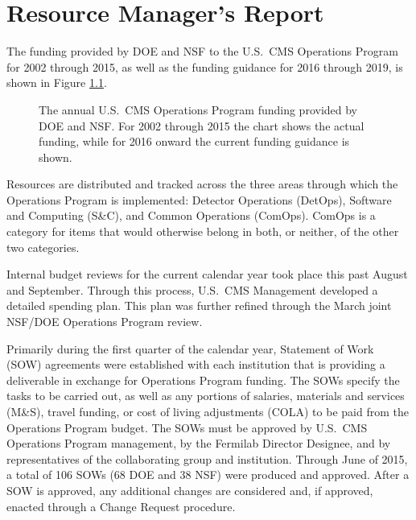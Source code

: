 
\chapter{Resource Manager's Report}

The funding provided by DOE and NSF to the U.S.\ CMS Operations Program
for 2002 through 2015, as well as the funding guidance for 2016 through 2019,
is shown in Figure \ref{fig:funding_profile}.

\begin{figure}[hbtp]
  \begin{center}
    \caption{The annual U.S.\ CMS Operations Program funding provided by
DOE and NSF.  For 2002 through 2015 the chart shows the actual funding,
while for 2016 onward the current funding guidance is shown.}
    \label{fig:funding_profile}
  \end{center}
\end{figure}

Resources are distributed and tracked across the three areas through
which the Operations Program is implemented:  Detector Operations (DetOps),
Software and Computing (S\&C), and Common Operations (ComOps).
ComOps is a category for items that would otherwise belong in both, or
neither, of the other two categories.

Internal budget reviews for the current calendar year took place this
past August and September.  Through this process, U.S.\ CMS Management
developed a detailed spending plan.  This plan was further refined
through the March joint NSF/DOE Operations Program review.

Primarily during the first quarter of the calendar year,
Statement of Work (SOW) agreements were established with each institution
that is providing a deliverable in exchange for Operations Program funding.
The SOWs specify the tasks to be carried out, as well as any portions of
salaries, materials and services (M\&S), travel funding, or cost of living
adjustments (COLA) to be paid from the Operations Program budget.
The SOWs must be approved by U.S.\ CMS Operations Program management,
by the Fermilab Director Designee, and by
representatives of the collaborating group and institution.
Through June of 2015, a total of 106 SOWs (68 DOE and 38 NSF) were produced
and approved.  After a SOW is approved, any additional changes are considered and,
if approved, enacted through a Change Request procedure.

